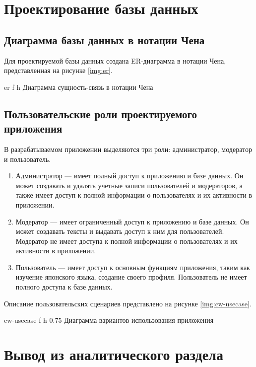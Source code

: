 \clearpage

\section{Проектирование базы данных}

\subsection{Диаграмма базы данных в нотации Чена}

Для проектируемой базы данных создана ER-диаграмма в нотации Чена, представленная на рисунке \ref{img:er}.

  {er}
  {f}
  {h}
  {\linewidth}
  {Диаграмма сущность-связь в нотации Чена}

\subsection{Пользовательские роли проектируемого приложения}

В разрабатываемом приложении выделяются три роли: администратор,
модератор и пользователь.

\begin{enumerate}
  \item Администратор --- имеет полный
    доступ к приложению и базе данных. Он может создавать и 
    удалять учетные записи пользователей и модераторов, а также имеет доступ к полной информации о пользователях и их активности в приложении.
  \item Модератор --- имеет ограниченный 
    доступ к приложению и базе данных. Он может создавать тексты и
    выдавать доступ к ним для пользователей. Модератор не имеет доступа к полной информации о пользователях и их активности в приложении.
  \item Пользователь --- имеет 
    доступ к основным функциям приложения, таким как изучение 
    японского языка, создание своего профиля. Пользователь не имеет полного доступа к базе данных.
\end{enumerate}

Описание пользовательских сценариев представлено на рисунке \ref{img:cw-usecase}.

  {cw-usecase}
  {f}
  {h}
  {0.75\linewidth}
  {Диаграмма вариантов использования приложения}

\section*{Вывод из аналитического раздела}

